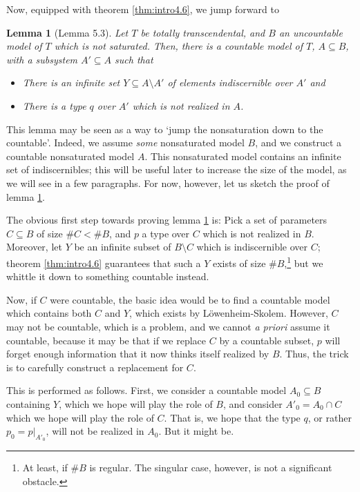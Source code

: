 \documentclass{article}
\newtheorem{lemma}[theorem]{Lemma}
\theoremstyle{nonumberplain}
\newcommand{\card}[1]{\#{#1}}
\begin{document}
Now, equipped with theorem \ref{thm:intro4.6}, we jump forward to
\begin{lemma}[Lemma 5.3]\label{lem:intro5.3}
Let $T$ be totally transcendental, and $B$ an uncountable model of $T$ which is not saturated. Then, there is a countable model of $T$, $A \subseteq B$, with a subsystem $A' \subseteq A$ such that
\begin{itemize}
\item There is an infinite set $Y \subseteq A \setminus A'$ of elements indiscernible over $A'$ and
\item There is a type $q$ over $A'$ which is not realized in $A$.
\end{itemize}
\end{lemma}

This lemma may be seen as a way to `jump the nonsaturation down to the countable'. Indeed, we assume \emph{some} nonsaturated model $B$, and we construct a countable nonsaturated model $A$. This nonsaturated model contains an infinite set of indiscernibles; this will be useful later to increase the size of the model, as we will see in a few paragraphs. For now, however, let us sketch the proof of lemma \ref{lem:intro5.3}.

The obvious first step towards proving lemma \ref{lem:intro5.3} is: Pick a set of parameters $C \subseteq B$ of size $\card C < \card B$, and $p$ a type over $C$ which is not realized in $B$. Moreover, let $Y$ be an infinite subset of $B \setminus C$ which is indiscernible over $C$; theorem \ref{thm:intro4.6} guarantees that such a $Y$ exists of size $\card B$,\footnote{At least, if $\card B$ is regular. The singular case, however, is not a significant obstacle.} but we whittle it down to something countable instead.

Now, if $C$ were countable, the basic idea would be to find a countable model which contains both $C$ and $Y$, which exists by Löwenheim-Skolem. However, $C$ may not be countable, which is a problem, and we cannot \textit{a priori} assume it countable, because it may be that if we replace $C$ by a countable subset, $p$ will forget enough information that it now thinks itself realized by $B$. Thus, the trick is to carefully construct a replacement for $C$.

This is performed as follows. First, we consider a countable model $A_0 \subseteq B$ containing $Y$, which we hope will play the role of $B$, and consider $A'_0 = A_0 \cap C$ which we hope will play the role of $C$. That is, we hope that the type $q$, or rather $p_0 = p|_{A'_0}$, will not be realized in $A_0$. But it might be.
\end{document}
